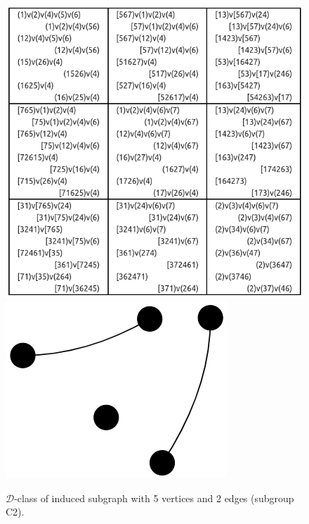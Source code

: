 \begin{appendices}
\begin{figure}[H]
\includegraphics[scale=0.25]{images/x9/x9_5v_2e_2.png}
\includegraphics[scale=0.1]{images/x9/x9_5v_2e_2_vis.png}
\caption{$\mathcal{D}$-class of induced subgraph with 5 vertices and 2 edges (subgroup C2).}
\end{figure}


\end{appendices}
